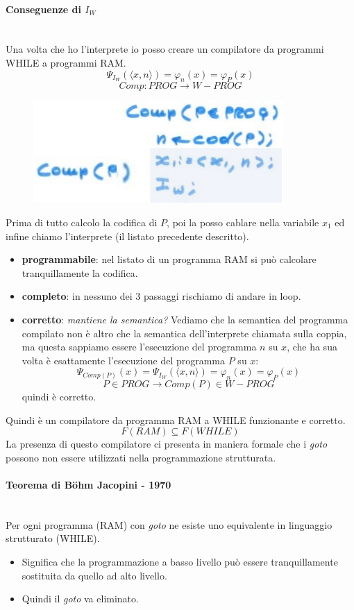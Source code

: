 \documentclass{article}
\begin{document}
\paragraph{Conseguenze di $I_W$}\mbox{}\\
Una volta che ho l'interprete io posso creare un compilatore da programmi WHILE a programmi RAM.
$$\Psi_{I_W}\left(\langle x,n\rangle\right)=\varphi_n(x)=\varphi_P(x)$$
$$Comp:PROG\rightarrow W-PROG$$
\begin{figure}[H]
    \centering
    \includegraphics[scale=0.6]{images/compi_Iw.png}
\end{figure}
Prima di tutto calcolo la codifica di $P$, poi la posso cablare nella variabile $x_1$
ed infine chiamo l'interprete (il listato precedente descritto).
\begin{itemize}
    \item \textbf{programmabile}: nel listato di un programma RAM si può calcolare
          tranquillamente la codifica.
    \item \textbf{completo}: in nessuno dei 3 passaggi rischiamo di andare in loop.
    \item \textbf{corretto}: \textit{mantiene la semantica?} Vediamo che la semantica
          del programma compilato non è altro che la semantica dell'interprete chiamata
          sulla coppia, ma questa sappiamo essere l'esecuzione del programma $n$ su $x$, che
          ha sua volta è esattamente l'esecuzione del programma $P$ su $x$:
          $$\Psi_{Comp(P)}(x)=\Psi_{I_W}\left(\langle x,n\rangle\right)=\varphi_n (x)=\varphi_P (x)$$
          $$P\in PROG\rightarrow Comp(P)\in W-PROG$$
          quindi è corretto.
\end{itemize}
Quindi è un compilatore da programma RAM a WHILE funzionante e corretto.
$$F(RAM)\subseteq F(WHILE)$$
La presenza di questo compilatore ci presenta in maniera formale che i \textit{goto}
possono non essere utilizzati nella programmazione strutturata.
\paragraph{Teorema di Böhm Jacopini - 1970}\mbox{}\\
Per ogni programma (RAM) con \textit{goto} ne esiste uno equivalente in linguaggio
strutturato (WHILE).
\begin{itemize}
    \item Significa che la programmazione a basso livello può essere tranquillamente
          sostituita da quello ad alto livello.
    \item Quindi il \textit{goto} va eliminato.
\end{itemize}
\end{document}
